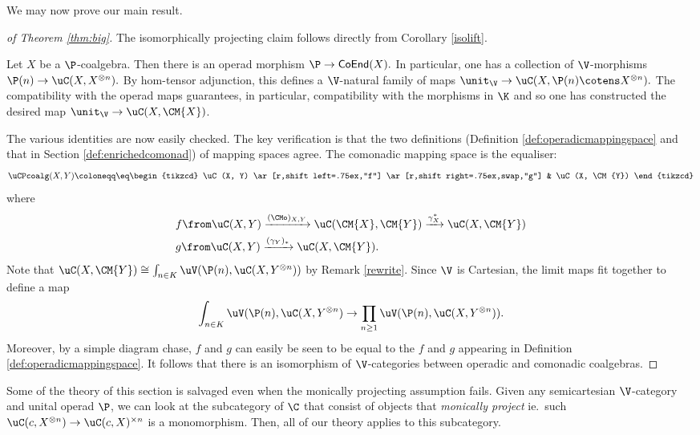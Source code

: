 \documentclass{tac}
\newcommand{\coend}{\mathsf{CoEnd}}
\begin{document}
We may now prove our main result.

\begin{proof}[of Theorem \ref{thm:big}]
The isomorphically projecting claim follows directly from Corollary \ref{isolift}.

    Let $X$ be a $\P$-coalgebra. Then there is an operad morphism
    $
    \P  \to \coend(X).
    $
    In particular, one has a collection of $\V$-morphisms
    $
    \P(n) \to \uC(X, X^{\otimes n}).
    $ 
    By hom-tensor adjunction, this defines a $\V$-natural family of maps
    $
    \unit_{\V} \to\uC(X, \P(n) \cotens X^{\otimes n} ).
    $
The compatibility with the operad maps guarantees, in particular, compatibility with the morphisms in $\K$ and so one has constructed the desired map $\unit_{\V} \to\uC(X, \CM{X})$.

The various identities are now easily checked. The key verification is that the two definitions (Definition \ref{def:operadicmappingspace} and that in Section \ref{def:enrichedcomonad}) of mapping spaces agree. The comonadic mapping space is the equaliser:
$$
\uCPcoalg(X, Y) \coloneqq \eq \begin{tikzcd}
\uC(X, Y) \ar[r,shift left=.75ex,"f"]
  \ar[r,shift right=.75ex,swap,"g"]
&
\uC(X, \CM{Y})
\end{tikzcd}
$$
where
\begin{align*}
&f\from \uC(X, Y) \xrightarrow{(\CMo)_{X, Y}} \uC(\CM{X}, \CM{Y})  \xrightarrow{\gamma_X^{\ast}}\uC(X, \CM{Y})
\\
&g \from \uC(X, Y) \xrightarrow{(\gamma_Y)_\ast}\uC(X, \CM{Y}).
\end{align*}
Note that $\uC(X, \CM{Y}) \cong \int_{n \in K} \uV(\P(n), \uC(X, Y^{\otimes n}))$ by Remark \ref{rewrite}. Since $\V$ is Cartesian, the limit maps fit together to define a map 
$$
\int_{n \in K}  \uV(\P(n), \uC(X, Y^{\otimes n}) \to \prod_{n\geq 1} \uV(\P(n), \uC(X, Y^{\otimes n})).
$$
Moreover, by a simple diagram chase, $f$ and $g$ can easily be seen to be equal to the $f$ and $g$ appearing in Definition \ref{def:operadicmappingspace}. It follows that there is an isomorphism of $\V$-categories between operadic and comonadic coalgebras.
\end{proof}
\begin{remark}
Some of the theory of this section is salvaged even when the monically projecting assumption fails. Given any semicartesian $\V$-category and unital operad $\P$, we can look at the subcategory of $\C$ that consist of objects that \emph{monically project} ie.\ such $\uC(c, X^{\otimes n})\to \uC(c, X)^{\times n}$ is a monomorphism. Then, all of our theory applies to this subcategory.
\end{remark}
\end{document}
